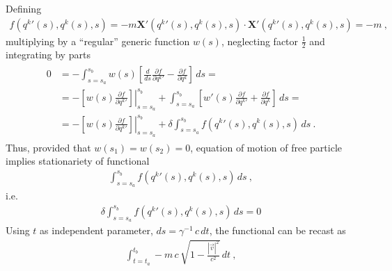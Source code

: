 \documentclass[letterpaper,10pt,english]{jupyterBook}
\begin{document}
\sphinxAtStartPar
Defining
\begin{equation*}
\begin{split} f\left({q^k}'(s), q^k(s), s \right) = - m \mathbf{X}'\left({q^k}'(s), q^k(s), s\right) \cdot \mathbf{X}'\left({q^k}'(s), q^k(s), s\right) = - m \ ,\end{split}
\end{equation*}
\sphinxAtStartPar
multiplying by a “regular” generic function \(w(s)\), neglecting factor \(\frac{1}{2}\) and integrating by parts
\begin{equation*}
\begin{split}\begin{aligned}
 0
 & = - \int_{s=s_a}^{s_b} w(s) \left[ \frac{d}{ds} \frac{\partial f}{\partial {q^k}'} - \frac{\partial f}{\partial q^k} \right] \, ds = \\
 & = - \left.\left[ w(s) \frac{\partial f}{\partial {q^k}'} \right]\right|_{s=s_a}^{s_b} + \int_{s=s_a}^{s_b} \left[ w'(s) \frac{\partial f}{\partial {q^k}'} + \frac{\partial f}{\partial q^k} \right] \, ds = \\
 & = - \left.\left[ w(s) \frac{\partial f}{\partial {q^k}'} \right]\right|_{s=s_a}^{s_b} + \delta \int_{s=s_a}^{s_b} f\left( {q^k}'(s), q^k(s), s \right) \, ds \ .
\end{aligned}\end{split}
\end{equation*}
\sphinxAtStartPar
Thus, provided that \(w(s_1) = w(s_2) = 0\), equation of motion of free particle implies stationariety of functional
\begin{equation*}
\begin{split}\int_{s=s_a}^{s_b} f\left( {q^k}'(s), q^k(s), s \right) \, ds \ ,\end{split}
\end{equation*}
\sphinxAtStartPar
i.e.
\begin{equation*}
\begin{split}\delta \int_{s=s_a}^{s_b} f\left( {q^k}'(s), q^k(s), s \right) \, ds = 0\end{split}
\end{equation*}
\sphinxAtStartPar
Using \(t\) as independent parameter, \(ds = \gamma^{-1} \, c \, dt\), the functional can be recast as
\begin{equation*}
\begin{split}\int_{t=t_a}^{t_b}  -m \, c  \, \sqrt{1 - \frac{|\vec{v}|^2}{c^2}} \, dt \ ,\end{split}
\end{equation*}
\sphinxAtStartPar
\end{document}
